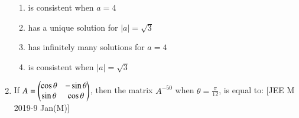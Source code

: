\documentclass[journal,,12pt,twocolumn]{IEEEtran}
\theoremstyle{remark}
\begin{document}
\begin{enumerate}
\begin{enumerate}
    

    \item is consistent when $a=4$
    \item has a unique solution for $|a|= \sqrt{3}$
    \item has infinitely many solutions for $a=4$
    \item is consistent when $|a|= \sqrt{3}$
    
\end{enumerate}
\item If $A= \begin{pmatrix}
    \cos{\theta} & -\sin{\theta} \\
    \sin{\theta} & \cos{\theta}
\end{pmatrix}$, then the matrix $A^{-50}$ when $\theta=\frac{\pi}{12}$, is equal to: 
\hfill{[JEE M 2019-9 Jan(M)]}
\begin{enumerate}
\end{enumerate}
\end{enumerate}
\end{document}

